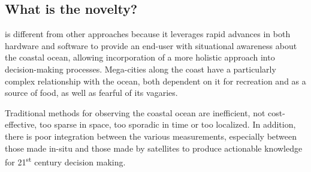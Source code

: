 \documentclass[12pt]{article}
\begin{document}


\vspace*{0.1cm}
\subsection{What is the novelty?}

\pro is different from other approaches because it leverages rapid
advances in both hardware and software to provide an end-user with
situational awareness about the coastal ocean, allowing incorporation
of a more holistic approach into decision-making
processes. Mega-cities along the coast have a particularly complex
relationship with the ocean, both dependent on it for recreation and
as a source of food, as well as fearful of its vagaries.

Traditional methods for observing the coastal ocean are inefficient,
not cost-effective, too sparse in space, too sporadic in time or too
localized. In addition, there is poor integration between the various
measurements, especially between those made in-situ and those made by
satellites to produce actionable knowledge for 21\textsuperscript{st}
century decision making.


\end{document}

